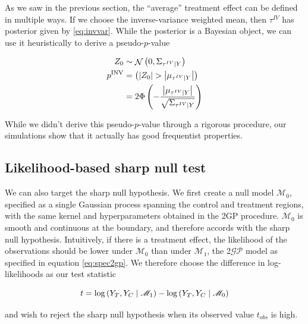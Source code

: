 \documentclass[letter]{article}
\newcommand{\genericdel}[3]{%
      \left#1#3\right#2
    }
\newcommand{\del}[1]{\genericdel(){#1}}
\let\Pr\relax
\DeclareMathOperator{\Pr}{\mathbb{P}}
\DeclareMathOperator{\normal}{\mathcal{N}}
\newcommand{\abs}[1]{\genericdel||{#1}}
\newcommand{\gp}{\mathcal{GP}}
\newcommand{\invvar}{\tau^{IV}}
\newcommand{\modnull}{\mathscr{M}_0}
\newcommand{\modalt}{\mathscr{M}_1}
\begin{document}
As we saw in the previous section, the ``average'' treatment effect can
be defined in multiple ways. If we choose the inverse-variance weighted
mean, then \(\invvar\) has posterior given by \eqref{eq:invvar}. While
the posterior is a Bayesian object, we can use it heuristically to
derive a pseudo-\(p\)-value

\begin{equation}
\begin{split}
    Z_0 &\sim \normal\del{0, \Sigma_{\invvar \mid Y}}  \\
    p^{\mathrm{INV}} &= \Pr\del{ 
        \abs{Z_0} > 
        \abs{
            \mu_{
                \invvar \mid Y
            }
        } 
    } \\
    &= 2\Phi\del{-
        \frac{
            \abs{
                \mu_{
                    \invvar \mid Y
                }
            }
        }{
            \sqrt{
                \Sigma_{\invvar \mid Y}
            }
        }
    }
\end{split}
\end{equation}

While we didn't derive this pseudo-\(p\)-value through a rigorous
procedure, our simulations show that it actually has good frequentist
properties.
    


    	\subsection{Likelihood-based sharp null
test}\label{likelihood-based-sharp-null-test}

We can also target the sharp null hypothesis. We first create a null
model \(\modnull\), specified as a single Gaussian process spanning the
control and treatment regions, with the same kernel and hyperparameters
obtained in the 2GP procedure. \(\modnull\) is smooth and continuous at
the boundary, and therefore accords with the sharp null hypothesis.
Intuitively, if there is a treatment effect, the likelihood of the
observations should be lower under \(\modnull\) than under \(\modalt\),
the 2\(\gp\) model as specified in equation \eqref{eq:spec2gp}. We
therefore choose the difference in log-likelihoods as our test statistic

\begin{equation}
    t = \log \Pr\del{Y_T, Y_C \mid \modalt} - \log \Pr\del{Y_T, Y_C \mid \modnull}
\end{equation}

and wish to reject the sharp null hypothesis when its observed value
\(t_{obs}\) is high.
\end{document}

